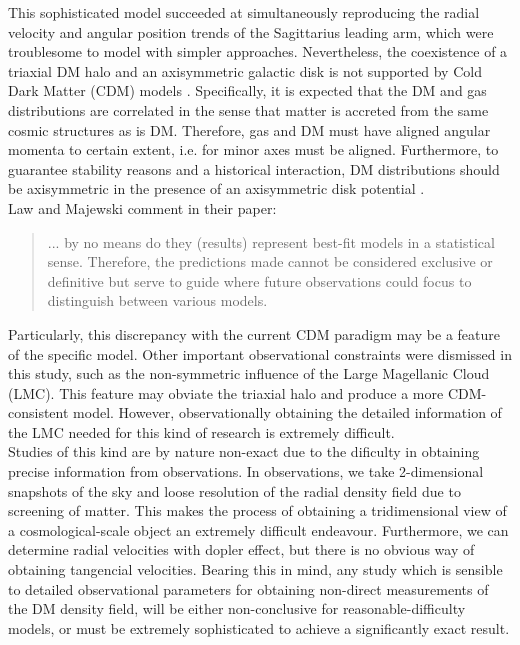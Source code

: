 This sophisticated model succeeded at simultaneously reproducing the radial velocity and angular position trends of the Sagittarius leading arm, which were troublesome to model with simpler approaches. 
Nevertheless, the coexistence of a triaxial DM halo and an axisymmetric galactic disk is not supported by Cold Dark Matter (CDM) models \cite{Debattista_et_al._2008}. 
Specifically, it is expected that the DM and gas distributions are correlated in the sense that matter is accreted from the same cosmic structures as is DM. 
Therefore, gas and DM must have aligned angular momenta to certain extent, i.e. for minor axes must be aligned. 
Furthermore, to guarantee stability reasons and a historical interaction, DM distributions should be axisymmetric in the presence of an axisymmetric disk potential \cite{Ostriker_and_Peebles_1973}.\\

Law and Majewski comment in their paper: 

\blockquote{... by no means do they (results) represent best-fit models in a statistical sense. Therefore, the predictions made cannot be considered exclusive or definitive but serve to guide where future observations could focus to distinguish between various models.}
 
Particularly, this discrepancy with the current CDM paradigm may be a feature of the specific model. 
Other important observational constraints were dismissed in this study, such as the non-symmetric influence of the Large Magellanic Cloud (LMC). 
This feature may obviate the triaxial halo and produce a more CDM-consistent model. 
However, observationally obtaining the detailed information of the LMC needed for this kind of research is extremely difficult.\\

Studies of this kind are by nature non-exact due to the dificulty in obtaining precise information from observations. 
In observations, we take 2-dimensional snapshots of the sky and loose resolution of the radial density field due to screening of matter. 
This makes the process of obtaining  a tridimensional view of a cosmological-scale object an extremely difficult endeavour. 
Furthermore, we can determine radial velocities with dopler effect, but there is no obvious way of obtaining tangencial velocities. 
Bearing this in mind, any study which is sensible to detailed observational parameters for obtaining non-direct measurements of the DM density field, will be either non-conclusive for reasonable-difficulty models, or must be extremely sophisticated to achieve a significantly exact result.\\

